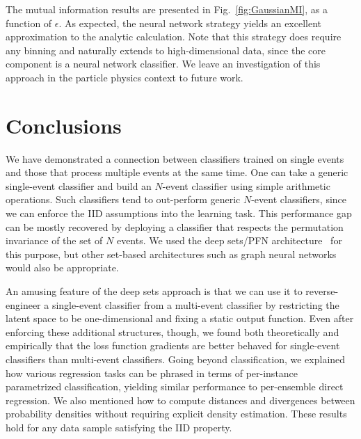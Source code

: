 \documentclass[aps,prx,reprint,preprintnumbers,superscriptaddress,nofootinbib,longbibliography,floatfix]{revtex4-2}
\DeclareRobustCommand{\Fig}[1]{Fig.~\ref{fig:#1}}
\begin{document}
The mutual information results are presented in \Fig{GaussianMI}, as a function of $\epsilon$.
%
As expected, the neural network strategy yields an excellent approximation to the analytic calculation.
%
Note that this strategy does require any binning and naturally extends to high-dimensional data, since the core component is a neural network classifier.
%
We leave an investigation of this approach in the particle physics context to future work.




\section{Conclusions}
\label{sec:conclusions}

We have demonstrated a connection between classifiers trained on single events and those that process multiple events at the same time.
%
One can take a generic single-event classifier and build an $N$-event classifier using simple arithmetic operations.
%
Such classifiers tend to out-perform generic $N$-event classifiers, since we can enforce the IID assumptions into the learning task.
%
This performance gap can be mostly recovered by deploying a classifier that respects the permutation invariance of the set of $N$ events.
%
We used the deep sets/PFN architecture~\cite{10.5555/3294996.3295098,Komiske:2018cqr} for this purpose, but other set-based architectures such as graph neural networks~\cite{10.1109/TNN.2008.2005605,Shlomi:2020gdn} would also be appropriate.


An amusing feature of the deep sets approach is that we can use it to reverse-engineer a single-event classifier from a multi-event classifier by restricting the latent space to be one-dimensional and fixing a static output function.
%
Even after enforcing these additional structures, though, we found both theoretically and empirically that the loss function gradients are better behaved for single-event classifiers than multi-event classifiers.
%
Going beyond classification, we explained how various regression tasks can be phrased in terms of per-instance parametrized classification, yielding similar performance to per-ensemble direct regression.
%
We also mentioned how to compute distances and divergences between probability densities without requiring explicit density estimation.
%
These results hold for any data sample satisfying the IID property. 
\end{document}
